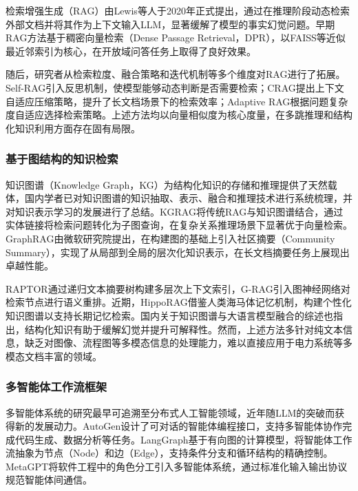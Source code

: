 检索增强生成（RAG）由Lewis等人\cite{lewis2020retrieval}于2020年正式提出，通过在推理阶段动态检索外部文档并将其作为上下文输入LLM，显著缓解了模型的事实幻觉问题。早期RAG方法基于稠密向量检索（Dense Passage Retrieval，DPR），以FAISS等近似最近邻索引为核心，在开放域问答任务上取得了良好效果。

随后，研究者从检索粒度、融合策略和迭代机制等多个维度对RAG进行了拓展。Self-RAG\cite{asai2023selfrag}引入反思机制，使模型能够动态判断是否需要检索；CRAG\cite{yan2024crag}提出上下文自适应压缩策略，提升了长文档场景下的检索效率；Adaptive RAG\cite{jeong2024adaptive}根据问题复杂度自适应选择检索策略。上述方法均以向量相似度为核心度量，在多跳推理和结构化知识利用方面存在固有局限。

\subsubsection{基于图结构的知识检索}

知识图谱（Knowledge Graph，KG）为结构化知识的存储和推理提供了天然载体，国内学者已对知识图谱的知识抽取、表示、融合和推理技术进行系统梳理\cite{xu2016kgreview}，并对知识表示学习的发展进行了总结\cite{liu2016krl}。KGRAG\cite{kgrag2023}将传统RAG与知识图谱结合，通过实体链接将检索问题转化为子图查询，在复杂关系推理场景下显著优于向量检索。GraphRAG\cite{edge2024graphrag}由微软研究院提出，在构建图的基础上引入社区摘要（Community Summary），实现了从局部到全局的层次化知识表示，在长文档摘要任务上展现出卓越性能。

RAPTOR\cite{sarthi2024raptor}通过递归文本摘要树构建多层次上下文索引，G-RAG\cite{grag2024}引入图神经网络对检索节点进行语义重排。近期，HippoRAG\cite{gutierrez2024hipporag}借鉴人类海马体记忆机制，构建个性化知识图谱以支持长期记忆检索。国内关于知识图谱与大语言模型融合的综述也指出，结构化知识有助于缓解幻觉并提升可解释性\cite{cao2025kgllmreview}。然而，上述方法多针对纯文本信息，缺乏对图像、流程图等多模态信息的处理能力，难以直接应用于电力系统等多模态文档丰富的领域。

\subsubsection{多智能体工作流框架}

多智能体系统的研究最早可追溯至分布式人工智能领域，近年随LLM的突破而获得新的发展动力。AutoGen\cite{wu2023autogen}设计了可对话的智能体编程接口，支持多智能体协作完成代码生成、数据分析等任务。LangGraph基于有向图的计算模型，将智能体工作流抽象为节点（Node）和边（Edge），支持条件分支和循环结构的精确控制。MetaGPT\cite{hong2023metagpt}将软件工程中的角色分工引入多智能体系统，通过标准化输入输出协议规范智能体间通信。

